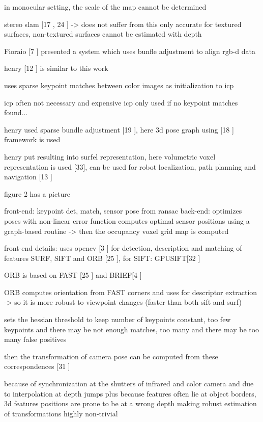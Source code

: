 in monocular setting, the scale of the map cannot be  determined

stereo slam [17 \cite{Konolige08Outdoor}, 24 \cite{Paz08Large}] -> does not suffer from this
only accurate for textured surfaces, non-textured surfaces cannot be estimated with depth

Fioraio [7 \cite{Fioraio11Realtime}] presented a system which uses bunfle adjustment to align rgb-d data

henry [12 \cite{Henry10Rgb,Henry14Rgb}] is similar to this work

uses sparse keypoint matches between color images as initialization to icp

icp often not necessary and expensive
icp only used if no keypoint matches found...

henry used sparse bundle adjustment [19 \cite{Lourakis09Sba} ], here 3d pose graph using [18 \cite{Kummerle11G}] framework is used

henry put resulting into surfel representation, here volumetric voxel representation is used [33], can be used for robot localization, path planning and navigation [13 \cite{Hornung10Humanoid}]

figure 2 has a picture

front-end: keypoint det, match, sensor pose from ransac
back-end: optimizes poses with non-linear error function
	computes optimal sensor positions using a graph-based routine -> then the occupancy voxel grid map is computed
	
front-end details: 
uses opencv [3 \cite{Bradski08Learning}] for detection, description and matching of features SURF, SIFT and ORB [25 \cite{Rublee11Orb} ], for SIFT: GPUSIFT[32 \cite{Wu07Siftgpu}]

ORB is based on FAST [25 \cite{Rosten06Machine}] and BRIEF[4 \cite{Calonder10Brief}]

ORB computes orientation from FAST corners and uses for descriptor extraction -> so it is more robust to viewpoint changes (faster than both sift and surf)

sets the hessian threshold to keep number of keypoints constant, too few keypoints and there may be not enough matches, too many and there may be too many false positives

then the transformation of camera pose can be computed from these correspondences [31 \cite{Umeyama91Least}]


because of synchronization at the shutters of infrared and color camera and due to interpolation at depth jumps
plus because features often lie at object borders, 3d features positions are prone to be at a wrong depth making robust estimation of transformations highly non-trivial

